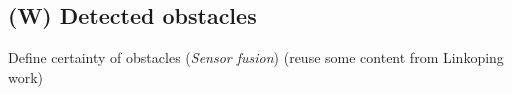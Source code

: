 \subsection{(W) Detected obstacles}\label{s:detectedObstacles}
    \noindent Define certainty of obstacles (\emph{Sensor fusion}) (reuse some content from Linkoping work)

